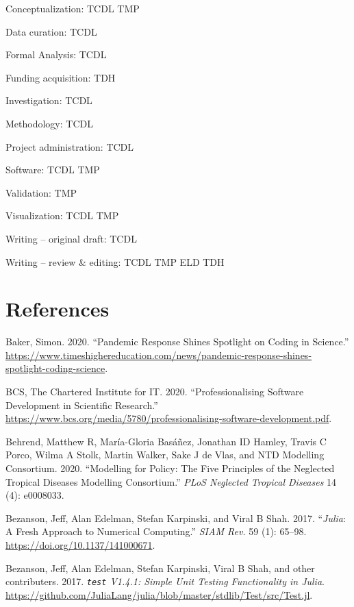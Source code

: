 \documentclass[
]{article}
\begin{document}
Conceptualization: TCDL TMP

Data curation: TCDL

Formal Analysis: TCDL

Funding acquisition: TDH

Investigation: TCDL

Methodology: TCDL

Project administration: TCDL

Software: TCDL TMP

Validation: TMP

Visualization: TCDL TMP

Writing -- original draft: TCDL

Writing -- review \& editing: TCDL TMP ELD TDH

\hypertarget{references}{%
\section*{References}\label{references}}

\hypertarget{refs}{}
\leavevmode\hypertarget{ref-funds}{}%
Baker, Simon. 2020. ``Pandemic Response Shines Spotlight on Coding in Science.'' \url{https://www.timeshighereducation.com/news/pandemic-response-shines-spotlight-coding-science}.

\leavevmode\hypertarget{ref-it}{}%
BCS, The Chartered Institute for IT. 2020. ``Professionalising Software Development in Scientific Research.'' \url{https://www.bcs.org/media/5780/professionalising-software-development.pdf}.

\leavevmode\hypertarget{ref-behrend2020modelling}{}%
Behrend, Matthew R, María-Gloria Basáñez, Jonathan ID Hamley, Travis C Porco, Wilma A Stolk, Martin Walker, Sake J de Vlas, and NTD Modelling Consortium. 2020. ``Modelling for Policy: The Five Principles of the Neglected Tropical Diseases Modelling Consortium.'' \emph{PLoS Neglected Tropical Diseases} 14 (4): e0008033.

\leavevmode\hypertarget{ref-bezanson2017julia}{}%
Bezanson, Jeff, Alan Edelman, Stefan Karpinski, and Viral B Shah. 2017. ``\emph{Julia}: A Fresh Approach to Numerical Computing.'' \emph{SIAM Rev.} 59 (1): 65--98. \url{https://doi.org/10.1137/141000671}.

\leavevmode\hypertarget{ref-juliatest}{}%
Bezanson, Jeff, Alan Edelman, Stefan Karpinski, Viral B Shah, and other contributers. 2017. \emph{\texttt{test} V1.4.1: Simple Unit Testing Functionality in Julia}. \url{https://github.com/JuliaLang/julia/blob/master/stdlib/Test/src/Test.jl}.
\end{document}
